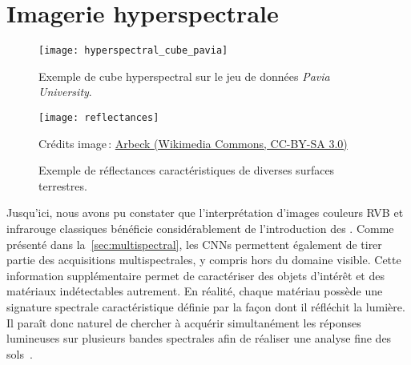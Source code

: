 
\section{Imagerie hyperspectrale}

\begin{figure}
  \begin{minipage}[t]{0.485\textwidth}
      \texttt{[image: hyperspectral\_cube\_pavia]}
      \caption{Exemple de cube hyperspectral sur le jeu de données \emph{Pavia University}.}
      \label{fig:cube_hyperspectral}
  \end{minipage}
  \hfill
  \begin{minipage}[t]{0.485\textwidth}
      \texttt{[image: reflectances]}
      \caption{Exemple de réflectances caractéristiques de diverses surfaces terrestres.}
      \small{Crédits image\,: \href{https://commons.wikimedia.org/wiki/File:R\%C3\%A9flectance_surfaces_terrestres.png}{Arbeck (Wikimedia Commons, CC-BY-SA 3.0)}}
      \label{fig:reflectances}
  \end{minipage}
\end{figure}

Jusqu'ici, nous avons pu constater que l'interprétation d'images couleurs \gls{RVB} et infrarouge classiques bénéficie considérablement de l'introduction des . Comme présenté dans la~\cref{sec:multispectral}, les \glspl{CNN} permettent également de tirer partie des acquisitions multispectrales, y compris hors du domaine visible. Cette information supplémentaire permet de caractériser des objets d'intérêt et des matériaux indétectables autrement. En réalité, chaque matériau possède une signature spectrale caractéristique définie par la façon dont il réfléchit la lumière. Il paraît donc naturel de chercher à acquérir simultanément les réponses lumineuses sur plusieurs bandes spectrales afin de réaliser une analyse fine des sols~\cite{cubero-castan_physics-based_2015,fabre_estimation_2015}.

